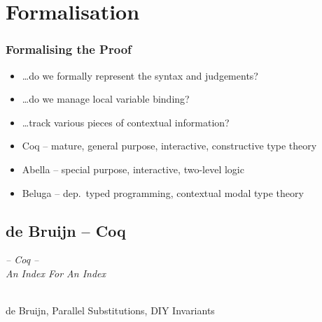 \documentclass[english,pdftex,dvipsnames,leqno,handout]{beamer}%
\newcommand{\hl}[1]{\emph{\color{sbmcyan} #1}}
\begin{document}
\section{Formalisation}

\begin{frame}
  \frametitle{Formalising the Proof}
  \begin{itemize}
  \item \ldots do we formally represent the syntax and judgements?
  \item \ldots do we manage local variable binding?
  \item \ldots track various pieces of contextual information?
  \end{itemize}
  \begin{itemize}
  \item Coq -- mature, general purpose, interactive, constructive type theory
  \item Abella -- special purpose, interactive, two-level logic
  \item Beluga -- dep.\ typed programming, contextual modal type theory
  \end{itemize}
\end{frame}

\subsection{de Bruijn -- Coq}

\begin{frame}
  \begin{center}
    \begin{Large}
      \hl{-- Coq --\\[1em]An Index For An Index}
    \end{Large}\\[2em]
    de Bruijn, Parallel Substitutions, DIY Invariants
  \end{center}
\end{frame}
\end{document}
